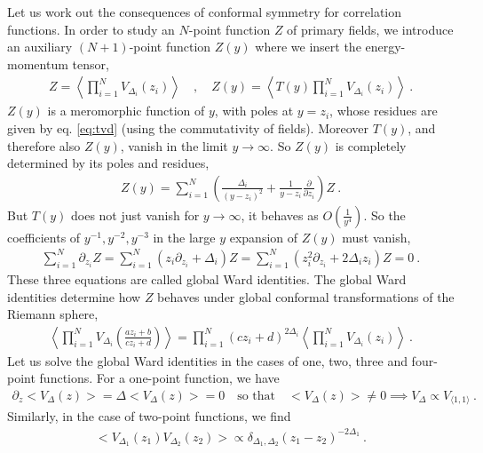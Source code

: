 \documentclass[12pt, a4paper]{article}
\theoremstyle{break}
\begin{document}
Let us work out the consequences of conformal symmetry for correlation functions.
In order to study an $N$-point function $Z$ of primary fields, we introduce an auxiliary $(N+1)$-point function $Z(y)$ where we insert the energy-momentum tensor,
\begin{align}
 Z = \left< \prod_{i=1}^N V_{\Delta_i}(z_i) \right> \quad , \quad Z(y) = \left< T(y) \prod_{i=1}^N V_{\Delta_i}(z_i) \right> \ .
\end{align}
$Z(y)$ is a meromorphic function of $y$, with poles at $y=z_i$, whose residues are given by eq. \eqref{eq:tvd} (using the commutativity of fields).
Moreover $T(y)$, and therefore also $Z(y)$, vanish in the limit $y\to \infty$. So $Z(y)$ is completely determined by its poles and residues,
\begin{align}
 Z(y) = \sum_{i=1}^N \left(\frac{\Delta_i}{(y-z_i)^2} +\frac{1}{y-z_i}\frac{\partial}{\partial z_i}\right) Z\ .
 \label{eq:zy}
\end{align}
But $T(y)$ does not just vanish for $y\to \infty$, it behaves as $O(\frac{1}{y^4})$.
So the coefficients of $y^{-1}, y^{-2}, y^{-3}$ in the large $y$ expansion of $Z(y)$ must vanish, 
\begin{align}
 \sum_{i=1}^N \partial_{z_i} Z = \sum_{i=1}^N \left(z_i \partial_{z_i} + \Delta_i\right) Z = \sum_{i=1}^N \left(z_i^2 \partial_{z_i} + 2\Delta_iz_i\right) Z = 0\ .
 \label{eq:gward}
\end{align}
These three equations are called global Ward identities. 
The global Ward identities determine how $Z$ behaves under global conformal transformations of the Riemann sphere,
\begin{align}
 \left< \prod_{i=1}^N  V_{\Delta_i}\left(\frac{az_i+b}{cz_i+d}\right) \right>
 = \prod_{i=1}^N (cz_i +d)^{2\Delta_i} \left< \prod_{i=1}^N V_{\Delta_i}(z_i) \right>\ .
 \label{eq:zgc}
\end{align}
Let us solve the global Ward identities in the cases of one, two, three and four-point functions. For a one-point function, we have 
\begin{align}
\partial_z \Big< V_\Delta(z)\Big> =  \Delta \Big< V_\Delta(z)\Big> = 0\quad \text{so that} \quad \Big< V_\Delta(z)\Big> \neq 0 \implies V_\Delta \propto V_{\langle 1,1\rangle}\ .
\end{align}
Similarly, in the case of two-point functions, we find 
\begin{align}
 \Big< V_{\Delta_1}(z_1)V_{\Delta_2}(z_2) \Big> \propto \delta_{\Delta_1,\Delta_2} (z_1-z_2)^{-2\Delta_1} \ .
 \label{eq:2pt}
\end{align}
\end{document}
